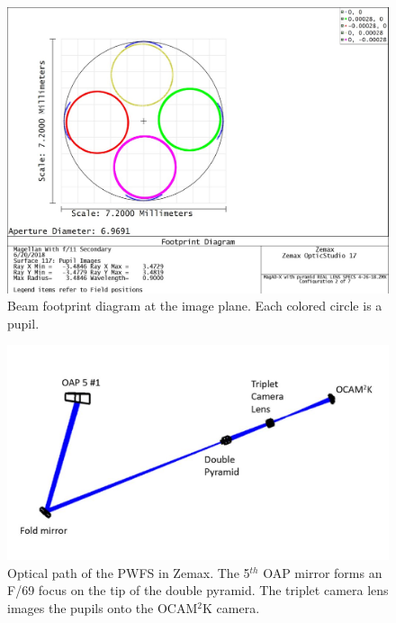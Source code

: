 \begin{figure}[h]
	\centering
	\includegraphics[width=.9\textwidth]{Chapter Materials/Chapter Three Materials/Pupils6-20-18.jpg}
	\caption{Beam footprint diagram at the image plane. Each colored circle is a pupil.}
	\label{fig:footprint}
\end{figure}

\begin{figure}
    \centering
    \includegraphics[width=.8\textwidth]{Chapter Materials/Chapter Three Materials/layout.jpg}
    \caption{Optical path of the PWFS in Zemax. The 5$^{th}$ OAP mirror forms an F/69 focus on the tip of the double pyramid. The triplet camera lens images the pupils onto the OCAM$^2$K camera.}
    \label{fig:my_label}
\end{figure}

